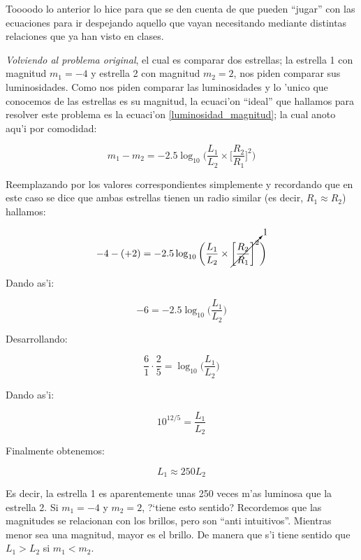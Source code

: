 \documentclass{article}
\begin{document}
\begin{enumerate}[a)]
\vspace{2mm}

Toooodo lo anterior lo hice para que se den cuenta de que pueden ``jugar'' con las ecuaciones para ir despejando aquello que vayan necesitando mediante distintas relaciones que ya han visto en clases.

\emph{Volviendo al problema original}, el cual es comparar dos estrellas; la estrella 1 con magnitud $m_1 = -4$ y estrella 2 con magnitud $m_2 = 2$, nos piden comparar sus luminosidades. Como nos piden comparar las luminosidades y lo 'unico que conocemos de las estrellas es su magnitud, la ecuaci'on ``ideal'' que hallamos para resolver este problema es la ecuaci'on \eqref{luminosidad_magnitud}; la cual anoto aqu'i por comodidad:

\begin{equation*} 
m_1 - m_2 = -2.5 \log_{10} \bigg( \frac{L_1}{L_2} \times \bigg[\frac{R_2}{R_1} \bigg]^2 \bigg)
\end{equation*}

Reemplazando por los valores correspondientes simplemente y recordando que en este caso se dice que ambas estrellas tienen un radio similar (es decir, $R_1 \approx R_2$) hallamos:

\begin{equation*}
-4 - (+2) = -2.5 \log_{10} \bigg( \frac{L_1}{L_2} \times \cancelto{1}{\bigg[\frac{R_2}{R_1} \bigg]^2} \bigg)
\end{equation*}

Dando as'i:

\begin{equation*}
-6 = -2.5 \log_{10} \bigg(\frac{L_1}{L_2} \bigg)
\end{equation*}

Desarrollando:

\begin{equation*}
\frac{6}{1} \cdot \frac{2}{5} = \log_{10} \bigg(\frac{L_1}{L_2} \bigg)
\end{equation*}

Dando as'i:

\begin{equation*}
10^{12/5} = \frac{L_1}{L_2}
\end{equation*}

Finalmente obtenemos:

\begin{equation}
L_1 \approx 250 L_2
\end{equation}

Es decir, la estrella 1 es aparentemente unas 250 veces m'as luminosa que la estrella 2. Si $m_1 = -4$ y $m_2 = 2$, ?`tiene esto sentido? Recordemos que las magnitudes se relacionan con los brillos, pero son ``anti intuitivos''. Mientras menor sea una magnitud, mayor es el brillo. De manera que s'i tiene sentido que $L_1 > L_2$ si $m_1 < m_2$.


\end{enumerate}
\end{document}
